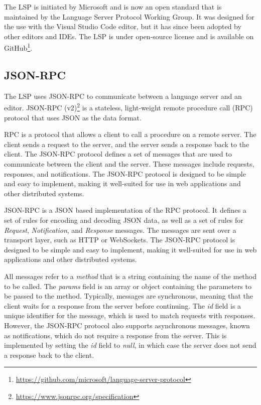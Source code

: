The LSP is initiated by Microsoft and is now an open standard that is maintained by the Language Server Protocol Working Group. It was designed for the use with the Visual Studio Code editor, but it has since been adopted by other editors and IDEs. The LSP is under open-source license and is available on GitHub\footnote{\url{https://github.com/microsoft/language-server-protocol}}.

\subsection{JSON-RPC}\label{subsec:JSONRPC}
The LSP uses JSON-RPC to communicate between a language server and an editor. JSON-RPC (v2)\footnote{\url{https://www.jsonrpc.org/specification}} is a stateless, light-weight remote procedure call (RPC) \cite{Birrell84} protocol that uses JSON as the data format.

RPC is a protocol that allows a client to call a procedure on a remote server. The client sends a request to the server, and the server sends a response back to the client. The JSON-RPC protocol defines a set of messages that are used to communicate between the client and the server. These messages include requests, responses, and notifications. The JSON-RPC protocol is designed to be simple and easy to implement, making it well-suited for use in web applications and other distributed systems.

JSON-RPC is a JSON based implementation of the RPC protocol. It defines a set of rules for encoding and decoding JSON data, as well as a set of rules for \textit{Request}, \textit{Notification}, and \textit{Response} messages. The messages are sent over a transport layer, such as HTTP or WebSockets. The JSON-RPC protocol is designed to be simple and easy to implement, making it well-suited for use in web applications and other distributed systems.

All messages refer to a \textit{method} that is a string containing the name of the method to be called. The \textit{params} field is an array or object containing the parameters to be passed to the method. Typically, messages are synchronous, meaning that the client waits for a response from the server before continuing. The \textit{id} field is a unique identifier for the message, which is used to match requests with responses. However, the JSON-RPC protocol also supports asynchronous messages, known as notifications, which do not require a response from the server. This is implemented by setting the \textit{id} field to \textit{null}, in which case the server does not send a response back to the client.

